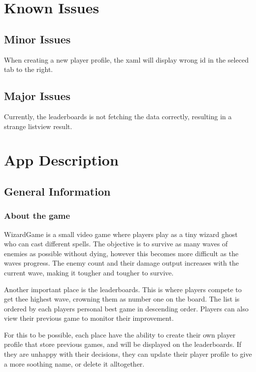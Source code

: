 \documentclass[12pt]{article}
\begin{document}
\section{Known Issues}

    \subsection{Minor Issues}

    When creating a new player profile, the xaml will display wrong id in the seleced tab to the right.

    \subsection{Major Issues}

    Currently, the leaderboards is not fetching the data correctly, resulting in a strange listview result.

\section{App Description}

    \subsection{General Information}

        \subsubsection{About the game}

        WizardGame is a small video game where players play as a tiny wizard ghost who can cast different spells. The objective is to survive as many waves of enemies as possible without dying, however this becomes more difficult as the waves progress. The enemy count and their damage output increases with the current wave, making it tougher and tougher to survive. 
        
        Another important place is the leaderboards. This is where players compete to get thee highest wave, crowning them as number one on the board. The list is ordered by each players personal best game in descending order. Players can also view their previous game to monitor their improvement.

        For this to be possible, each place have the ability to create their own player profile that store previous games, and will be displayed on the leaderboards. If they are unhappy with their decisions, they can update their player profile to give a more soothing name, or delete it alltogether.
\end{document}
